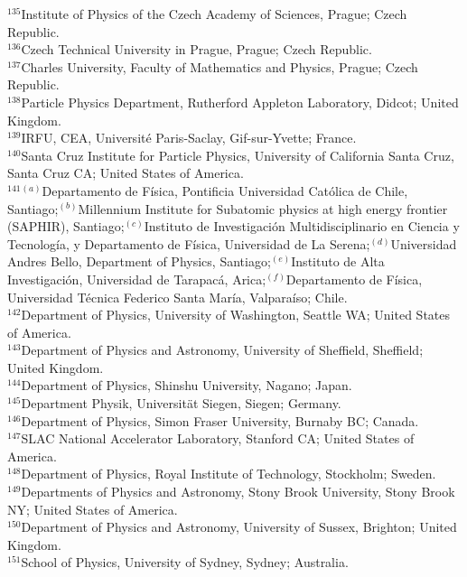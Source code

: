 \begin{flushleft}
$^{135}$Institute of Physics of the Czech Academy of Sciences, Prague; Czech Republic.\\
$^{136}$Czech Technical University in Prague, Prague; Czech Republic.\\
$^{137}$Charles University, Faculty of Mathematics and Physics, Prague; Czech Republic.\\
$^{138}$Particle Physics Department, Rutherford Appleton Laboratory, Didcot; United Kingdom.\\
$^{139}$IRFU, CEA, Universit\'e Paris-Saclay, Gif-sur-Yvette; France.\\
$^{140}$Santa Cruz Institute for Particle Physics, University of California Santa Cruz, Santa Cruz CA; United States of America.\\
$^{141}$$^{(a)}$Departamento de F\'isica, Pontificia Universidad Cat\'olica de Chile, Santiago;$^{(b)}$Millennium Institute for Subatomic physics at high energy frontier (SAPHIR), Santiago;$^{(c)}$Instituto de Investigaci\'on Multidisciplinario en Ciencia y Tecnolog\'ia, y Departamento de F\'isica, Universidad de La Serena;$^{(d)}$Universidad Andres Bello, Department of Physics, Santiago;$^{(e)}$Instituto de Alta Investigaci\'on, Universidad de Tarapac\'a, Arica;$^{(f)}$Departamento de F\'isica, Universidad T\'ecnica Federico Santa Mar\'ia, Valpara\'iso; Chile.\\
$^{142}$Department of Physics, University of Washington, Seattle WA; United States of America.\\
$^{143}$Department of Physics and Astronomy, University of Sheffield, Sheffield; United Kingdom.\\
$^{144}$Department of Physics, Shinshu University, Nagano; Japan.\\
$^{145}$Department Physik, Universit\"{a}t Siegen, Siegen; Germany.\\
$^{146}$Department of Physics, Simon Fraser University, Burnaby BC; Canada.\\
$^{147}$SLAC National Accelerator Laboratory, Stanford CA; United States of America.\\
$^{148}$Department of Physics, Royal Institute of Technology, Stockholm; Sweden.\\
$^{149}$Departments of Physics and Astronomy, Stony Brook University, Stony Brook NY; United States of America.\\
$^{150}$Department of Physics and Astronomy, University of Sussex, Brighton; United Kingdom.\\
$^{151}$School of Physics, University of Sydney, Sydney; Australia.\\
$$
\end{flushleft}
